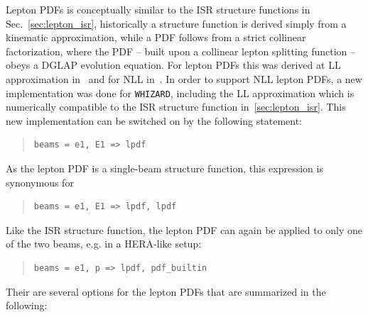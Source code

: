 \documentclass[12pt]{book}
\newcommand{\ttt}[1]{\texttt{#1}}
\newcommand{\whizard}{\ttt{WHIZARD}}
\begin{document}
Lepton PDFs is conceptually similar to the ISR structure functions in
Sec.~\ref{sec:lepton_isr}, historically a structure function is
derived simply from a kinematic approximation, while a PDF follows
from a strict collinear factorization, where the PDF -- built upon a
collinear lepton splitting function -- obeys a DGLAP evolution
equation. For lepton PDFs this was derived at LL approximation
in~\cite{Skrzypek:1990qs,Cacciari:1992pz} and for NLL
in~\cite{Frixione:2019lga,Bertone:2019hks}. In order to support NLL
lepton PDFs, a new implementation was done for \whizard, including the
LL approximation which is numerically compatible to the ISR structure
function in~\ref{sec:lepton_isr}. This new implementation can be
switched on by the following statement:
\begin{quote}
\begin{footnotesize}
\begin{Verbatim}
beams = e1, E1 => lpdf
\end{Verbatim}
\end{footnotesize}
\end{quote}
As the lepton PDF is a single-beam structure function,
this expression is synonymous for
\begin{quote}
\begin{footnotesize}
\begin{Verbatim}
beams = e1, E1 => lpdf, lpdf
\end{Verbatim}
\end{footnotesize}
\end{quote}
Like the ISR structure function, the lepton PDF can again be applied
to only one of the two beams, e.g. in a HERA-like setup:
\begin{quote}
\begin{footnotesize}
\begin{Verbatim}
beams = e1, p => lpdf, pdf_builtin
\end{Verbatim}
\end{footnotesize}
\end{quote}

Their are several options for the lepton PDFs that are summarized in
the following:

\vspace{2mm}
\end{document}
